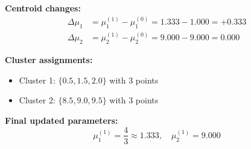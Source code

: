 \documentclass[12pt]{article}
\begin{document}
\begin{solution}
\textbf{Centroid changes:}
\begin{align*}
\Delta \mu_1 &= \mu_1^{(1)} - \mu_1^{(0)} = 1.333 - 1.000 = +0.333 \\
\Delta \mu_2 &= \mu_2^{(1)} - \mu_2^{(0)} = 9.000 - 9.000 = 0.000
\end{align*}

\textbf{Cluster assignments:}
\begin{itemize}
    \item Cluster 1: $\{0.5, 1.5, 2.0\}$ with 3 points
    \item Cluster 2: $\{8.5, 9.0, 9.5\}$ with 3 points
\end{itemize}

\textbf{Final updated parameters:}
\[
\boxed{\mu_1^{(1)} = \frac{4}{3} \approx 1.333, \quad \mu_2^{(1)} = 9.000}
\]

\end{solution}
\end{document}
